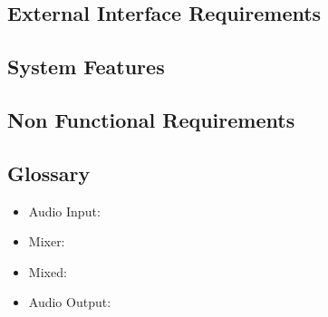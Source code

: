 \section{External Interface Requirements}
\section{System Features}
\section{Non Functional Requirements}





\begin{appendices}
\chapter{Glossary}

\begin{itemize}
	\item Audio Input:
	\item Mixer:
	\item Mixed:
	\item Audio Output:
\end{itemize}	


\end{appendices}


